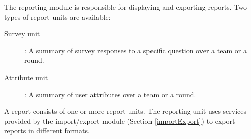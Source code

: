 The reporting module is responsible for displaying and exporting reports. Two types of report units are available:
\begin{description}
\item[Survey unit]:  A summary of survey responses to a specific question over a team or a round.  
\item[Attribute unit]:  A summary of user attributes over a team or a round.  
 \end{description}
A report consists of one or more report units.  The reporting unit uses services provided by the import/export module (Section \ref{importExport}) to export reports in different formats.